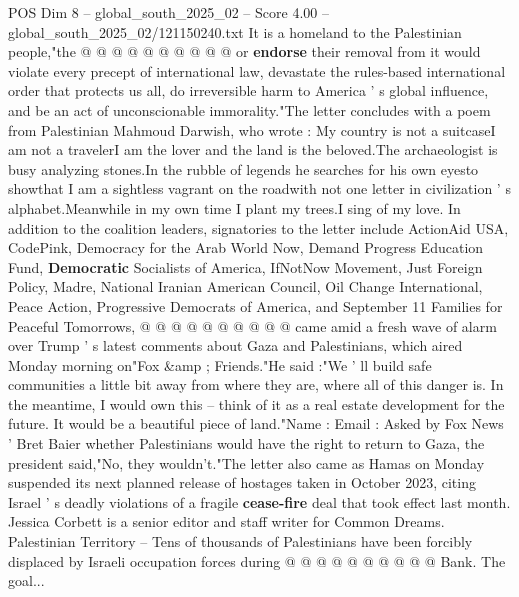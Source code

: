 \begin{textsample}{POS Dim 8 – global\_south\_2025\_02 – Score 4.00 – global\_south\_2025\_02/121150240.txt}
It is a homeland to the Palestinian people,"the @ @ @ @ @ @ @ @ @ @ or \textbf{endorse} their removal from it would violate every precept of international law, devastate the rules-based international order that protects us all, do irreversible harm to America ' s global influence, and be an act of unconscionable immorality."The letter concludes with a poem from Palestinian Mahmoud Darwish, who wrote : My country is not a suitcaseI am not a travelerI am the lover and the land is the beloved.The archaeologist is busy analyzing stones.In the rubble of legends he searches for his own eyesto showthat I am a sightless vagrant on the roadwith not one letter in civilization ' s alphabet.Meanwhile in my own time I plant my trees.I sing of my love.
In addition to the coalition leaders, signatories to the letter include ActionAid USA, CodePink, Democracy for the Arab World Now, Demand Progress Education Fund, \textbf{Democratic} Socialists of America, IfNotNow Movement, Just Foreign Policy, Madre, National Iranian American Council, Oil Change International, Peace Action, Progressive Democrats of America, and September 11 Families for Peaceful Tomorrows, @ @ @ @ @ @ @ @ @ @ came amid a fresh wave of alarm over Trump ' s latest comments about Gaza and Palestinians, which aired Monday morning on"Fox \&amp ; Friends."He said :"We ' ll build safe communities a little bit away from where they are, where all of this danger is.
In the meantime, I would own this -- think of it as a real estate development for the future.
It would be a beautiful piece of land."Name : Email : Asked by Fox News ' Bret Baier whether Palestinians would have the right to return to Gaza, the president said,"No, they wouldn't."The letter also came as Hamas on Monday suspended its next planned release of hostages taken in October 2023, citing Israel ' s deadly violations of a fragile \textbf{cease-fire} deal that took effect last month.
Jessica Corbett is a senior editor and staff writer for Common Dreams.
Palestinian Territory -- Tens of thousands of Palestinians have been forcibly displaced by Israeli occupation forces during @ @ @ @ @ @ @ @ @ @ Bank.
The goal...

\end{textsample}
